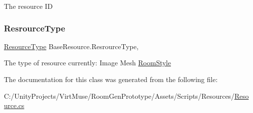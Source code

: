 The resource ID 

\mbox{\label{class_base_resource_a6c40931e66a2e4fd8061f069eb0c0ba8}} 
\subsubsection{\texorpdfstring{Resrource\+Type}{ResrourceType}}
{\footnotesize\ttfamily \mbox{\hyperlink{namespace_virt_muse_web_1_1_models_ab185d30c831a1ac813a53670c29d6397}{Resource\+Type}} Base\+Resource.\+Resrource\+Type\hspace{0.3cm}{\ttfamily [get]}, {\ttfamily [set]}}



The type of resource currently\+: Image Mesh \mbox{\hyperlink{class_room_style}{Room\+Style}} 



The documentation for this class was generated from the following file\+:\begin{DoxyCompactItemize}
\item 
C\+:/\+Unity\+Projects/\+Virt\+Muse/\+Room\+Gen\+Prototype/\+Assets/\+Scripts/\+Resources/\mbox{\hyperlink{_resource_8cs}{Resource.\+cs}}\end{DoxyCompactItemize}
